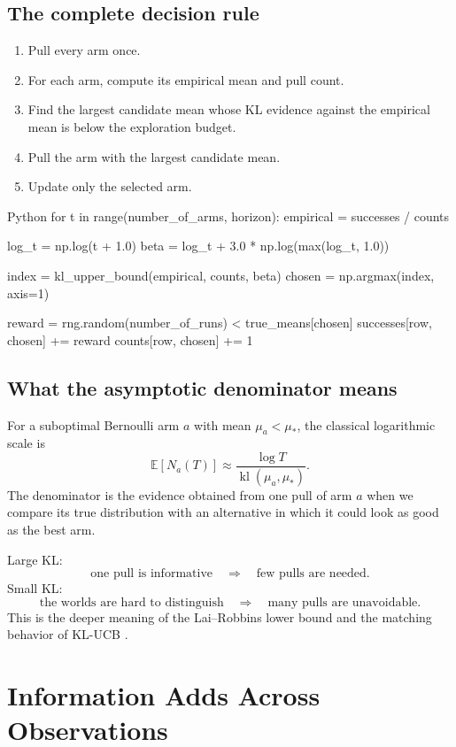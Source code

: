 \documentclass[en,nofont,11pt]{elegantbook}
\newcommand{\E}{\mathbb{E}}
\newcommand{\kl}{\operatorname{kl}}
\begin{document}
\section{The complete decision rule}

\begin{enumerate}
\item Pull every arm once.
\item For each arm, compute its empirical mean and pull count.
\item Find the largest candidate mean whose KL evidence against the empirical mean is below the exploration budget.
\item Pull the arm with the largest candidate mean.
\item Update only the selected arm.
\end{enumerate}

\begin{codeblock}{Python}
for t in range(number_of_arms, horizon):
    empirical = successes / counts

    log_t = np.log(t + 1.0)
    beta = log_t + 3.0 * np.log(max(log_t, 1.0))

    index = kl_upper_bound(empirical, counts, beta)
    chosen = np.argmax(index, axis=1)

    reward = rng.random(number_of_runs) < true_means[chosen]
    successes[row, chosen] += reward
    counts[row, chosen] += 1
\end{codeblock}

\section{What the asymptotic denominator means}

For a suboptimal Bernoulli arm $a$ with mean $\mu_a<\mu_*$, the classical logarithmic scale is
\[
\E[N_a(T)]
\approx
\frac{\log T}{\kl(\mu_a,\mu_*)}.
\]
The denominator is the evidence obtained from one pull of arm $a$ when we compare its true distribution with an alternative in which it could look as good as the best arm.

Large KL:
\[
\text{one pull is informative}
\quad\Longrightarrow\quad
\text{few pulls are needed}.
\]
Small KL:
\[
\text{the worlds are hard to distinguish}
\quad\Longrightarrow\quad
\text{many pulls are unavoidable}.
\]
This is the deeper meaning of the Lai--Robbins lower bound and the matching behavior of KL-UCB \cite{lai1985,garivier2011klucb,lattimore2020bandit}.

\chapter{Information Adds Across Observations}
\end{document}
